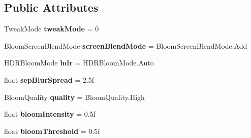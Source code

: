 \subsection*{Public Attributes}
\begin{DoxyCompactItemize}
\item 
Tweak\+Mode {\bfseries tweak\+Mode} = 0\hypertarget{class_unity_standard_assets_1_1_image_effects_1_1_bloom_a1da5c25475bbf245bf480a8f7108c50e}{}\label{class_unity_standard_assets_1_1_image_effects_1_1_bloom_a1da5c25475bbf245bf480a8f7108c50e}

\item 
Bloom\+Screen\+Blend\+Mode {\bfseries screen\+Blend\+Mode} = Bloom\+Screen\+Blend\+Mode.\+Add\hypertarget{class_unity_standard_assets_1_1_image_effects_1_1_bloom_a9839cb699eb7236b821df49927dbd767}{}\label{class_unity_standard_assets_1_1_image_effects_1_1_bloom_a9839cb699eb7236b821df49927dbd767}

\item 
H\+D\+R\+Bloom\+Mode {\bfseries hdr} = H\+D\+R\+Bloom\+Mode.\+Auto\hypertarget{class_unity_standard_assets_1_1_image_effects_1_1_bloom_a0d7cf39f98d61e8339d4bc71176def9b}{}\label{class_unity_standard_assets_1_1_image_effects_1_1_bloom_a0d7cf39f98d61e8339d4bc71176def9b}

\item 
float {\bfseries sep\+Blur\+Spread} = 2.\+5f\hypertarget{class_unity_standard_assets_1_1_image_effects_1_1_bloom_a4083416b05757f931884bbdcf4e6d562}{}\label{class_unity_standard_assets_1_1_image_effects_1_1_bloom_a4083416b05757f931884bbdcf4e6d562}

\item 
Bloom\+Quality {\bfseries quality} = Bloom\+Quality.\+High\hypertarget{class_unity_standard_assets_1_1_image_effects_1_1_bloom_a466b0e4e815af732ce073d17e9704c66}{}\label{class_unity_standard_assets_1_1_image_effects_1_1_bloom_a466b0e4e815af732ce073d17e9704c66}

\item 
float {\bfseries bloom\+Intensity} = 0.\+5f\hypertarget{class_unity_standard_assets_1_1_image_effects_1_1_bloom_aef10a8ab188a0ddf9b765f85cb5b609e}{}\label{class_unity_standard_assets_1_1_image_effects_1_1_bloom_aef10a8ab188a0ddf9b765f85cb5b609e}

\item 
float {\bfseries bloom\+Threshold} = 0.\+5f\hypertarget{class_unity_standard_assets_1_1_image_effects_1_1_bloom_a728f4244c0570b9d6f3e1558047c557c}{}\label{class_unity_standard_assets_1_1_image_effects_1_1_bloom_a728f4244c0570b9d6f3e1558047c557c}


\end{DoxyCompactItemize}
